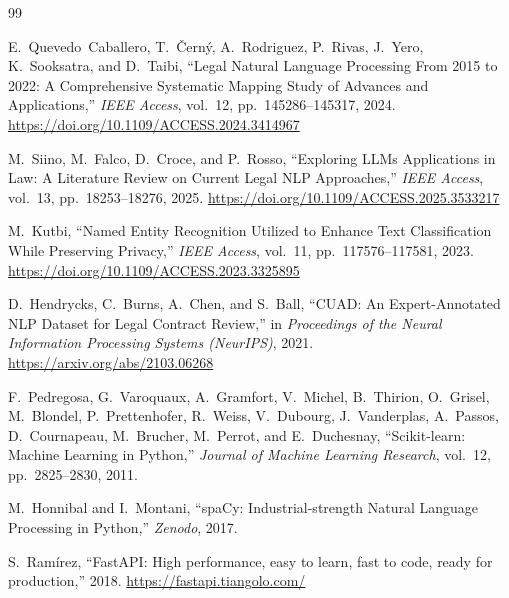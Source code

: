 \documentclass[12pt, a4paper]{report}
\begin{document}
\newpage
{}
{}
\begin{thebibliography}{99}

E.~Quevedo~Caballero, T.~\v{C}ern\'{y}, A.~Rodriguez, P.~Rivas, J.~Yero, K.~Sooksatra, and D.~Taibi,
``Legal Natural Language Processing From 2015 to 2022: A Comprehensive Systematic Mapping Study of Advances and Applications,''
\textit{IEEE Access}, vol.~12, pp.~145286--145317, 2024.
\url{https://doi.org/10.1109/ACCESS.2024.3414967}

M.~Siino, M.~Falco, D.~Croce, and P.~Rosso,
``Exploring LLMs Applications in Law: A Literature Review on Current Legal NLP Approaches,''
\textit{IEEE Access}, vol.~13, pp.~18253--18276, 2025.
\url{https://doi.org/10.1109/ACCESS.2025.3533217}

M.~Kutbi,
``Named Entity Recognition Utilized to Enhance Text Classification While Preserving Privacy,''
\textit{IEEE Access}, vol.~11, pp.~117576--117581, 2023.
\url{https://doi.org/10.1109/ACCESS.2023.3325895}

D.~Hendrycks, C.~Burns, A.~Chen, and S.~Ball,
``CUAD: An Expert-Annotated NLP Dataset for Legal Contract Review,''
in \textit{Proceedings of the Neural Information Processing Systems (NeurIPS)}, 2021.
\url{https://arxiv.org/abs/2103.06268}

F.~Pedregosa, G.~Varoquaux, A.~Gramfort, V.~Michel, B.~Thirion, O.~Grisel, M.~Blondel, P.~Prettenhofer, R.~Weiss, V.~Dubourg, J.~Vanderplas, A.~Passos, D.~Cournapeau, M.~Brucher, M.~Perrot, and E.~Duchesnay,
``Scikit-learn: Machine Learning in Python,''
\textit{Journal of Machine Learning Research}, vol.~12, pp.~2825--2830, 2011.

M.~Honnibal and I.~Montani,
``spaCy: Industrial-strength Natural Language Processing in Python,''
\textit{Zenodo}, 2017.

S.~Ram\'irez,
``FastAPI: High performance, easy to learn, fast to code, ready for production,''
2018. \url{https://fastapi.tiangolo.com/}

\end{thebibliography}
\end{document}
